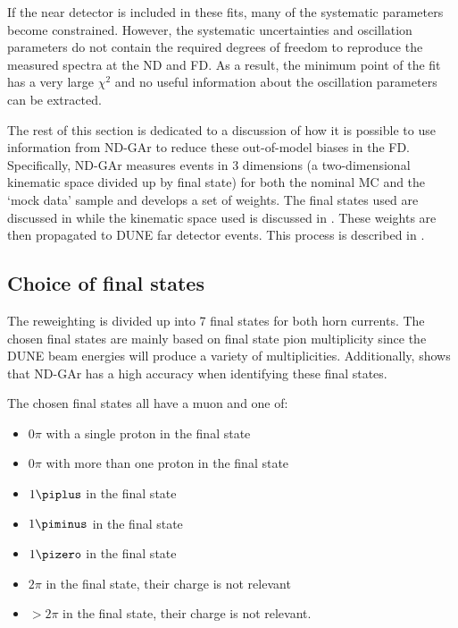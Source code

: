 If the near detector is included in these fits, many of the systematic parameters become constrained. 
However, the systematic uncertainties and oscillation parameters do not contain the required degrees of freedom to reproduce the measured spectra at the ND and FD. 
As a result, the minimum point of the fit has a very large $\chi^{2}$ and no useful information about the oscillation parameters can be extracted.

The rest of this section is dedicated to a discussion of how it is possible to use information from ND-GAr to reduce these out-of-model biases in the FD.
Specifically, ND-GAr measures events in 3 dimensions (a two-dimensional kinematic space divided up by final state) for both the nominal MC and the `mock data' sample and develops a set of weights.
The final states used are discussed in  while the kinematic space used is discussed in .
These weights are then propagated to DUNE far detector events. 
This process is described in .

\subsection{Choice of final states}
\label{sec:dune_ndrwt:rwt:states}

The reweighting is divided up into 7 final states for both horn currents.
The chosen final states are mainly based on final state pion multiplicity since the DUNE beam energies will produce a variety of multiplicities.
Additionally,  shows that ND-GAr has a high accuracy when identifying these final states.

The chosen final states all have a muon and one of:
\begin{itemize}
	\item $0\pi$ with a single proton in the final state
	\item $0\pi$ with more than one proton in the final state
	\item $1\piplus$ in the final state
	\item $1\piminus$ in the final state
	\item $1\pizero$ in the final state
	\item $2\pi$ in the final state, their charge is not relevant
	\item $>2\pi$ in the final state, their charge is not relevant.
\end{itemize}

